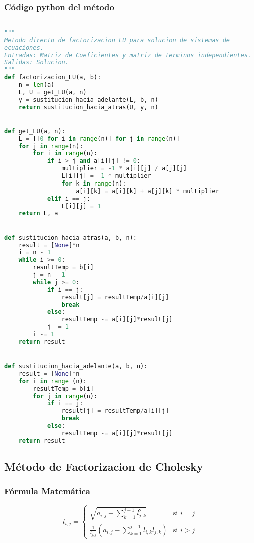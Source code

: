 \documentclass[12pt]{article}
\begin{document}
\subsubsection{Código python del método}
\begin{lstlisting}[language=Python, caption=Implementación del método de Factorizacion LU en Python] 

"""
Metodo directo de factorizacion LU para solucion de sistemas de 
ecuaciones.
Entradas: Matriz de Coeficientes y matriz de terminos independientes.
Salidas: Solucion.
"""
def factorizacion_LU(a, b):
    n = len(a)
    L, U = get_LU(a, n)
    y = sustitucion_hacia_adelante(L, b, n)
    return sustitucion_hacia_atras(U, y, n)


def get_LU(a, n):
    L = [[0 for i in range(n)] for j in range(n)]
    for j in range(n):
        for i in range(n):
            if i > j and a[i][j] != 0:
                multiplier = -1 * a[i][j] / a[j][j]
                L[i][j] = -1 * multiplier
                for k in range(n):
                    a[i][k] = a[i][k] + a[j][k] * multiplier
            elif i == j:
                L[i][j] = 1
    return L, a


def sustitucion_hacia_atras(a, b, n):
    result = [None]*n
    i = n - 1
    while i >= 0:
        resultTemp = b[i]
        j = n - 1
        while j >= 0:
            if i == j:
                result[j] = resultTemp/a[i][j]
                break
            else:
                resultTemp -= a[i][j]*result[j]
            j -= 1
        i -= 1
    return result


def sustitucion_hacia_adelante(a, b, n):
    result = [None]*n
    for i in range (n):
        resultTemp = b[i]
        for j in range(n):
            if i == j:
                result[j] = resultTemp/a[i][j]
                break
            else:
                resultTemp -= a[i][j]*result[j]
    return result


\end{lstlisting}

\subsection{Método de Factorizacion de Cholesky}
\subsubsection{Fórmula Matemática}
\[l_{i,j} = \begin{cases} 
      \sqrt{a_{i,j}-\sum_{k=1}^{j-1} l_{j,k}^2} & \text{si } i = j \\
      \frac{1}{l_{j,j}}(a_{i,j} - \sum_{k=1}^{j-1} l_{i,k}l_{j,k}) & \text{si } i > j 
   \end{cases}
\]
\end{document}
